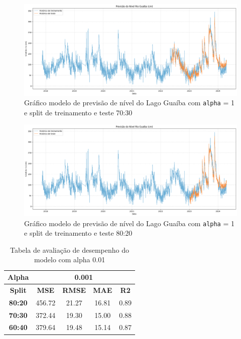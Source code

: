 \begin{figure}[H]
	\caption{\label{fig:comparacao_radiacao_nivel_rio}Gráfico modelo de previsão de nível do Lago Guaíba com \texttt{alpha} = 1 e split de treinamento e teste 70:30}
	\begin{center}
		\includegraphics[scale=0.35]{figuras/modelo_previsao_70_30.png}
	\end{center}
\end{figure}

\begin{figure}[H]
	\caption{\label{fig:comparacao_radiacao_nivel_rio}Gráfico modelo de previsão de nível do Lago Guaíba com \texttt{alpha} = 1 e split de treinamento e teste 80:20}
	\begin{center}
		\includegraphics[scale=0.35]{figuras/modelo_previsao_80_20.png}
	\end{center}
\end{figure}

\begin{table}[H]
\centering
\begin{tabular}{|c|c|c|c|c|}
\hline
\textbf{Alpha} & \multicolumn{4}{|c|}{\textbf{0.001}} \\
\hline
\textbf{Split} & \textbf{MSE} & \textbf{RMSE} & \textbf{MAE} & \textbf{R2} \\
\hline
\textbf{80:20} & 456.72 & 21.27 & 16.81 & 0.89 \\
\textbf{70:30} & 372.44 & 19.30 & 15.00 & 0.88 \\
\textbf{60:40} & 379.64 & 19.48 & 15.14 & 0.87 \\
\hline
\end{tabular}
\caption{Tabela de avaliação de desempenho do modelo com alpha 0.01}
\end{table}

